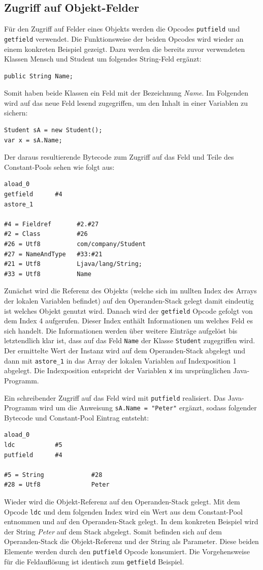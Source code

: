 \documentclass[conference]{IEEEtran}
\begin{document}
\subsection{Zugriff auf Objekt-Felder}
Für den Zugriff auf Felder eines Objekts werden die Opcodes \verb|putfield| und \verb|getfield| verwendet. Die Funktionsweise der beiden Opcodes wird wieder an einem konkreten Beispiel gezeigt. Dazu werden die bereits zuvor verwendeten Klassen Mensch und Student um folgendes String-Feld ergänzt:
\begin{lstlisting}
public String Name;
\end{lstlisting}
Somit haben beide Klassen ein Feld mit der Bezeichnung \textit{Name}. Im Folgenden wird auf das neue Feld lesend zugegriffen, um den Inhalt in einer Variablen zu sichern:
\begin{lstlisting}
Student sA = new Student();
var x = sA.Name;
\end{lstlisting}
Der daraus resultierende Bytecode zum Zugriff auf das Feld und Teile des Constant-Pools sehen wie folgt aus:
\begin{lstlisting}
aload_0
getfield      #4
astore_1

#4 = Fieldref       #2.#27         
#2 = Class          #26   
#26 = Utf8          com/company/Student         
#27 = NameAndType   #33:#21        
#21 = Utf8          Ljava/lang/String;
#33 = Utf8          Name
\end{lstlisting}
Zunächst wird die Referenz des Objekts (welche sich im nullten Index des Arrays der lokalen Variablen befindet) auf den Operanden-Stack gelegt damit eindeutig ist welches Objekt genutzt wird. Danach wird der \verb|getfield| Opcode gefolgt von dem Index 4 aufgerufen. Dieser Index enthält Informationen um welches Feld es sich handelt. Die Informationen werden über weitere Einträge aufgelöst bis letztendlich klar ist, dass auf das Feld \verb|Name| der Klasse \verb|Student| zugegriffen wird. Der ermittelte Wert der Instanz wird auf dem Operanden-Stack abgelegt und dann mit \verb|astore_1| in das Array der lokalen Variablen auf Indexposition 1 abgelegt. Die Indexposition entspricht der Variablen \verb|x| im ursprünglichen Java-Programm.

Ein schreibender Zugriff auf das Feld wird mit \verb|putfield| realisiert. Das Java-Programm wird um die Anweisung \verb|sA.Name = "Peter"| ergänzt, sodass folgender Bytecode und Constant-Pool Eintrag entsteht:
\begin{lstlisting}
aload_0
ldc           #5
putfield      #4

#5 = String             #28
#28 = Utf8              Peter
\end{lstlisting}
Wieder wird die Objekt-Referenz auf den Operanden-Stack gelegt. Mit dem Opcode \verb|ldc| und dem folgenden Index wird ein Wert aus dem Constant-Pool entnommen und auf den Operanden-Stack gelegt. In dem konkreten Beispiel wird der String \textit{Peter} auf dem Stack abgelegt. Somit befinden sich auf dem Operanden-Stack die Objekt-Referenz und der String als Parameter. Diese beiden Elemente werden durch den \verb|putfield| Opcode konsumiert. Die Vorgehensweise für die Feldauflösung ist identisch zum \verb|getfield| Beispiel. 
\end{document}
